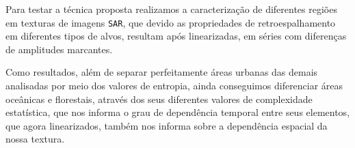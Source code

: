 \documentclass[12pt]{article}
\begin{document}
Para testar a técnica proposta realizamos a caracterização de diferentes regiões em texturas de imagens \texttt{SAR}, que devido as propriedades de retroespalhamento em diferentes tipos de alvos, resultam após linearizadas, em séries com diferenças de amplitudes marcantes. 

Como resultados, além de separar perfeitamente áreas urbanas das demais analisadas por meio dos valores de entropia, ainda conseguimos diferenciar áreas oceânicas e florestais, através dos seus diferentes valores de complexidade estatística, que nos informa o grau de dependência temporal entre seus elementos, que agora linearizados, também nos informa sobre a dependência espacial da nossa textura.



\end{document}
